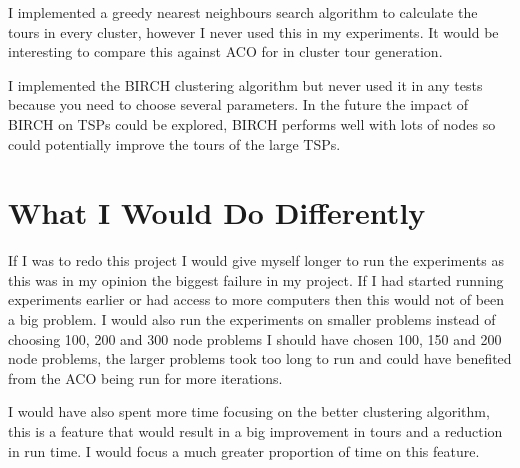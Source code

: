I implemented a greedy nearest neighbours search algorithm to calculate the tours in every cluster, however I never used this in my experiments. It would be interesting to compare this against ACO for in cluster tour generation.

I implemented the BIRCH clustering algorithm but never used it in any tests because you need to choose several parameters. In the future the impact of BIRCH on TSPs could be explored, BIRCH performs well with lots of nodes so could potentially improve the tours of the large TSPs. 

\section{What I Would Do Differently}

If I was to redo this project I would give myself longer to run the experiments as this was in my opinion the biggest failure in my project. If I had started running experiments earlier or had access to more computers then this would not of been a big problem. I would also run the experiments on smaller problems instead of choosing 100, 200 and 300 node problems I should have chosen 100, 150 and 200 node problems, the larger problems took too long to run and could have benefited from the ACO being run for more iterations.

I would have also spent more time focusing on the better clustering algorithm, this is a feature that would result in a big improvement in tours and a reduction in run time. I would focus a much greater proportion of time on this feature.
